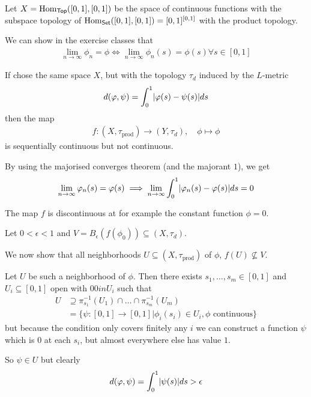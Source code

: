 \begin{ex}[]
  Let $X = \operatorname{Hom}_{\text{\sffamily Top}}([0,1],[0,1])$ be the space of continuous functions with the subspace topology of $\operatorname{Hom}_{\text{\sffamily Set}}([0,1],[0,1]) = [0,1]^{[0,1]}$ with the product topology.

  We can show in the exercise classes that 
  \begin{align*}
    \lim_{n \to \infty} \phi_n = \phi \iff \lim_{n \to \infty}\phi_n(s) = \phi(s) \forall s \in [0,1]
  \end{align*}

  If chose the same space $X$, but with the topology $\tau_d$ induced by the $L$-metric 
  \begin{align*}
    d(\phi, \psi) = \int_0^{1} \abs{\phi(s) - \psi(s)}ds
  \end{align*}
  then the map
  \begin{align*}
    f: (X,\tau_{\text{prod}}) \to (Y,\tau_{d}), \quad \phi \mapsto  \phi
  \end{align*}
  is sequentially continuous but not continuous.

  By using the majorised converges theorem (and the majorant $1$), we get
  \begin{align*}
    \lim_{n \to \infty}\phi_n(s) = \phi(s) \implies \lim_{n \to \infty} \int_0^1 \abs{\phi_n(s) - \phi(s)} ds = 0
  \end{align*}

  The map $f$ is discontinuous at for example the constant function $\phi = 0$.

  Let $0 < \epsilon < 1$ and $V = B_{\epsilon}(f(\phi_0)) \subseteq (X,\tau_{d})$.

  We now show that all neighborhoods $U \subseteq (X,\tau_{\text{prod}})$ of $\phi$, $f(U) \nsubseteq V$.

  Let $U$ be such a neighborhood of $\phi$. Then there exists $s_1, \ldots, s_m \in [0,1]$ and $U_i \subseteq [0,1]$ open with $00in U_i$ such that
  \begin{align*}
    U 
    &\supseteq \pi_{s_1}^{-1}(U_1) \cap \ldots \cap \pi_{s_m}^{-1}(U_m)\\
    &= \{\psi: [0,1] \to [0,1] \big\vert \phi_i(s_i) \in U_i, \phi \text{ continuous}\}
  \end{align*}
  but because the condition only covers finitely any $i$ we can construct a function $\psi$ which is $0$ at each $s_i$, but almost everywhere else has value $1$.

  So $\psi \in U$ but clearly
  \begin{align*}
    d(\phi,\psi) = \int_0^1 \abs{\psi(s)} ds > \epsilon
  \end{align*}
\end{ex}


